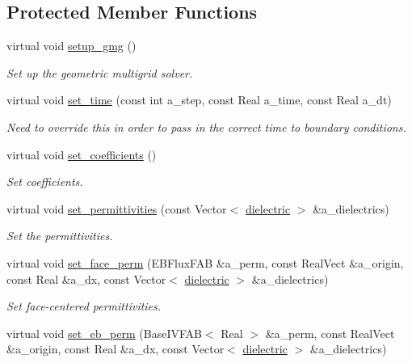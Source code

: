 \subsection*{Protected Member Functions}
\begin{DoxyCompactItemize}
\item 
virtual void \hyperlink{classpoisson__multifluid__gmg_a9a349c518392a2b6c51d05d10be2b966}{setup\+\_\+gmg} ()
\begin{DoxyCompactList}\small\item\em Set up the geometric multigrid solver. \end{DoxyCompactList}\item 
virtual void \hyperlink{classpoisson__multifluid__gmg_a61caaf491e6397931189feb876742448}{set\+\_\+time} (const int a\+\_\+step, const Real a\+\_\+time, const Real a\+\_\+dt)
\begin{DoxyCompactList}\small\item\em Need to override this in order to pass in the correct time to boundary conditions. \end{DoxyCompactList}\item 
virtual void \hyperlink{classpoisson__multifluid__gmg_a918b21f740b925276877f3bab5467556}{set\+\_\+coefficients} ()
\begin{DoxyCompactList}\small\item\em Set coefficients. \end{DoxyCompactList}\item 
virtual void \hyperlink{classpoisson__multifluid__gmg_a947623543ce8252d9411e168fa8a064e}{set\+\_\+permittivities} (const Vector$<$ \hyperlink{classdielectric}{dielectric} $>$ \&a\+\_\+dielectrics)
\begin{DoxyCompactList}\small\item\em Set the permittivities. \end{DoxyCompactList}\item 
virtual void \hyperlink{classpoisson__multifluid__gmg_a5b6c28bd655733f3ab6f777f57d8a56f}{set\+\_\+face\+\_\+perm} (E\+B\+Flux\+F\+AB \&a\+\_\+perm, const Real\+Vect \&a\+\_\+origin, const Real \&a\+\_\+dx, const Vector$<$ \hyperlink{classdielectric}{dielectric} $>$ \&a\+\_\+dielectrics)
\begin{DoxyCompactList}\small\item\em Set face-\/centered permittivities. \end{DoxyCompactList}\item 
virtual void \hyperlink{classpoisson__multifluid__gmg_afecb9a1a0e9c454dccd866ad471aa082}{set\+\_\+eb\+\_\+perm} (Base\+I\+V\+F\+AB$<$ Real $>$ \&a\+\_\+perm, const Real\+Vect \&a\+\_\+origin, const Real \&a\+\_\+dx, const Vector$<$ \hyperlink{classdielectric}{dielectric} $>$ \&a\+\_\+dielectrics)

\end{DoxyCompactItemize}
